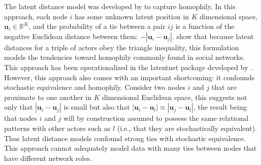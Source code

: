 \documentclass[12pt,pdflatex]{elsarticle}
\newcommand{\pkg}[1]{{\fontseries{b}\selectfont #1}}
\begin{document}

The latent distance model was developed by \citet{hoff:etal:2002} to capture homophily. In this approach, each node $i$ has some unknown latent position in $K$ dimensional space, $\textbf{u}_{i} \in \mathbb{R}^{K}$, and the probability of a tie between a pair $ij$ is a function of the negative Euclidean distance between them: $-|\textbf{u}_{i} - \textbf{u}_{j}|$. \citet{hoff:etal:2002} show that because latent distances for a triple of actors obey the triangle inequality, this formulation models the tendencies toward homophily commonly found in social networks. This approach has been operationalized in the \pkg{latentnet} package developed by \citet{krivitsky:handcock:2015}. However, this approach also comes with an important shortcoming: it confounds stochastic equivalence and homophily. Consider two nodes $i$ and $j$ that are proximate to one another in $K$ dimensional Euclidean space, this suggests not only that $|\textbf{u}_{i} - \textbf{u}_{j}|$ is small but also that $|\textbf{u}_{i} - \textbf{u}_{l}| \approx |\textbf{u}_{j} - \textbf{u}_{l}|$, the result being that nodes $i$ and $j$ will by construction assumed to possess the same relational patterns with other actors such as $l$ (i.e., that they are stochastically equivalent).%
Thus latent distance models confound strong ties with stochastic equivalence. This approach cannot adequately model data with many ties between nodes that have different network roles. 
\end{document}
